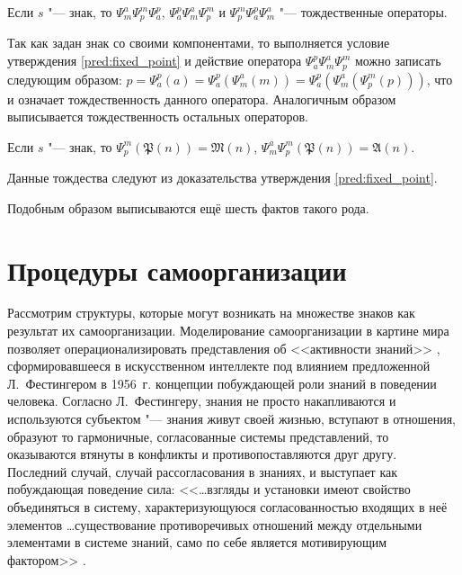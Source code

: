 \begin{Pred}
	Если $s$ "--- знак, то  $\Psi_m^a\Psi_p^m\Psi_a^p$, $\Psi_a^p\Psi_m^a\Psi_p^m$ и $\Psi_p^m\Psi_a^p\Psi_m^a$ "--- тождественные операторы.
\end{Pred}	
\begin{Proof}
	Так как задан знак со своими компонентами, то выполняется условие утверждения \ref{pred:fixed_point} и действие оператора $\Psi_a^p\Psi_m^a\Psi_p^m$ можно записать следующим образом:  $p=\Psi_a^p(a)=\Psi_a^p(\Psi_m^a(m))=\Psi_a^p(\Psi_m^a(\Psi_p^m(p)))$, что и означает тождественность данного оператора. Аналогичным образом выписывается тождественность остальных операторов.
\end{Proof}

\begin{Pred}
	Если $s$ "--- знак, то $\Psi_p^m(\mathfrak P(n))=\mathfrak M(n)$, $\Psi_m^a\Psi_p^m(\mathfrak P(n))=\mathfrak A(n)$.
\end{Pred}	
\begin{Proof}
	Данные тождества следуют из доказательства утверждения \ref{pred:fixed_point}.
\end{Proof}

Подобным образом выписываются ещё шесть фактов такого рода.


\section{Процедуры самоорганизации} \label{sect2_3}

Рассмотрим структуры, которые могут возникать на множестве знаков как результат их самоорганизации. Моделирование самоорганизации в картине мира позволяет операционализировать представления об <<активности знаний>> \cite{Osipov2002b}, сформировавшееся в искусственном интеллекте под влиянием предложенной Л.~Фестингером в 1956~г. концепции побуждающей роли знаний в поведении человека. Согласно Л.~Фестингеру, знания не просто накапливаются и используются субъектом "--- знания живут своей жизнью, вступают в отношения, образуют то гармоничные, согласованные системы представлений, то оказываются втянуты в конфликты и противопоставляются друг другу. Последний случай, случай рассогласования в знаниях, и выступает как побуждающая поведение сила: <<\dots взгляды и установки имеют свойство объединяться в систему, характеризующуюся согласованностью входящих в неё элементов \dots существование противоречивых отношений между отдельными элементами в системе знаний, само по себе является мотивирующим фактором>> \cite{Festinger1999}.

